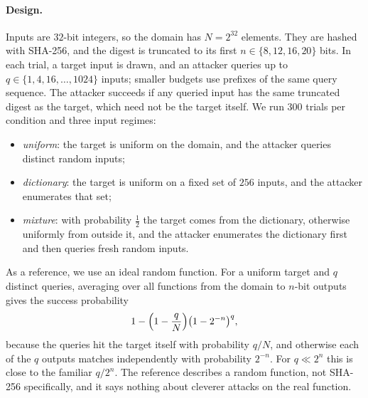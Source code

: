 \paragraph{Design.} Inputs are $32$-bit integers, so the domain has $N=2^{32}$ elements. They are hashed with SHA-256, and the digest is truncated to its first $n\in\{8,12,16,20\}$ bits. In each trial, a target input is drawn, and an attacker queries up to $q\in\{1,4,16,\dots,1024\}$ inputs; smaller budgets use prefixes of the same query sequence. The attacker succeeds if any queried input has the same truncated digest as the target, which need not be the target itself. We run $300$ trials per condition and three input regimes:
\begin{itemize}
\item \emph{uniform}: the target is uniform on the domain, and the attacker queries distinct random inputs;
\item \emph{dictionary}: the target is uniform on a fixed set of $256$ inputs, and the attacker enumerates that set;
\item \emph{mixture}: with probability $\tfrac12$ the target comes from the dictionary, otherwise uniformly from outside it, and the attacker enumerates the dictionary first and then queries fresh random inputs.
\end{itemize}
As a reference, we use an ideal random function. For a uniform target and $q$ distinct queries, averaging over all functions from the domain to $n$-bit outputs gives the success probability
\begin{equation}
1-\Bigl(1-\frac{q}{N}\Bigr)\bigl(1-2^{-n}\bigr)^{q},
\label{eq:random-function-reference}
\end{equation}
because the queries hit the target itself with probability $q/N$, and otherwise each of the $q$ outputs matches independently with probability $2^{-n}$. For $q\ll 2^n$ this is close to the familiar $q/2^n$. The reference describes a random function, not SHA-256 specifically, and it says nothing about cleverer attacks on the real function.

